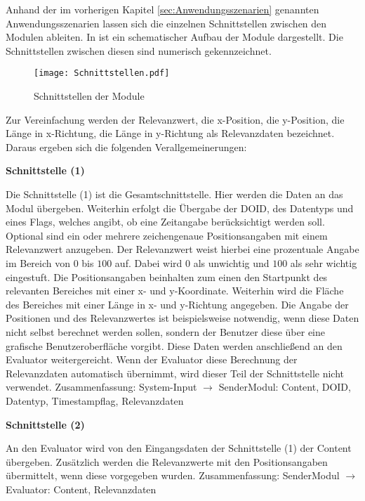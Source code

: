 Anhand der im vorherigen Kapitel \ref{sec:Anwendungsszenarien} genannten
Anwendungsszenarien lassen sich die einzelnen Schnittstellen zwischen den
Modulen ableiten. In  ist ein schematischer Aufbau
der Module dargestellt. Die Schnittstellen zwischen diesen sind numerisch
gekennzeichnet.

\begin{figure}[H]
	\centering
	\texttt{[image: Schnittstellen.pdf]}
	\caption{Schnittstellen der Module}
	\label{fig:Schnittstellen}
\end{figure}

Zur Vereinfachung werden der Relevanzwert, die x-Position, die
y-Position, die Länge in x-Richtung, die Länge in y-Richtung als Relevanzdaten
bezeichnet. Daraus ergeben sich die folgenden Verallgemeinerungen:

\textbf{Schnittstelle (1)}

Die Schnittstelle (1) ist die Gesamtschnittstelle. Hier werden die
Daten an das Modul übergeben. Weiterhin erfolgt die Übergabe der \gls{DOID}, des
Datentyps und eines Flags, welches angibt, ob eine Zeitangabe berücksichtigt
werden soll.
Optional sind ein oder mehrere zeichengenaue Positionsangaben mit einem
Relevanzwert anzugeben. Der Relevanzwert weist hierbei eine prozentuale Angabe
im Bereich von $0$ bis $100$ auf. Dabei wird $0$ als unwichtig und $100$ als
sehr wichtig eingestuft. Die Positionsangaben beinhalten zum einen den
Startpunkt des relevanten Bereiches mit einer x- und y-Koordinate. Weiterhin
wird die Fläche des Bereiches mit einer Länge in x- und y-Richtung angegeben.
Die Angabe der Positionen und des Relevanzwertes ist beispielsweise notwendig,
wenn diese Daten nicht selbst berechnet werden sollen, sondern der Benutzer
diese über eine grafische Benutzeroberfläche vorgibt. Diese Daten werden
anschließend an den Evaluator weitergereicht. Wenn der Evaluator diese
Berechnung der Relevanzdaten automatisch übernimmt, wird dieser Teil der
Schnittstelle nicht verwendet.
\newline 
Zusammenfassung: System-Input $\rightarrow$ SenderModul: Content, \gls{DOID},
Datentyp, Timestampflag, Relevanzdaten

\textbf{Schnittstelle (2)}

An den Evaluator wird von den Eingangsdaten der Schnittstelle (1)
der Content übergeben. Zusätzlich werden die Relevanzwerte mit den
Positionsangaben übermittelt, wenn diese vorgegeben wurden.\newline
Zusammenfassung: SenderModul $\rightarrow$ Evaluator: Content, Relevanzdaten  

